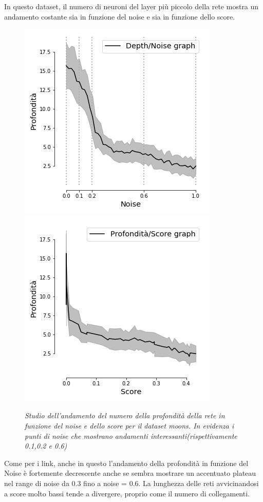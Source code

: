 \documentclass[12pt,a4paper]{report}
\begin{document}
In questo dataset, il numero di neuroni del layer più piccolo della rete mostra un andamento costante sia in funzione del noise e sia in funzione dello score. 

\begin{figure}[H]
 \centering
 \includegraphics[scale = 0.5]{images/depth_noise_moons}
 \includegraphics[scale = 0.5]{images/depth_Score_moons}
 \caption{\textit{Studio dell'andamento del numero della profondità della rete in funzione del noise e dello score per il dataset moons. In evidenza i punti di noise che mostrano andamenti interessanti(rispettivamente 0.1,0.2 e 0.6)}}
 \label{noisemoons}
\end{figure}

Come per i link, anche in questo l'andamento della profondità in funzione del Noise è fortemente decrescente anche se sembra mostrare un accentuato plateau nel range di noise da 0.3 fino a noise = 0.6.
La lunghezza delle reti avvicinandosi a score molto bassi tende a divergere, proprio come il numero di collegamenti.
\end{document}
